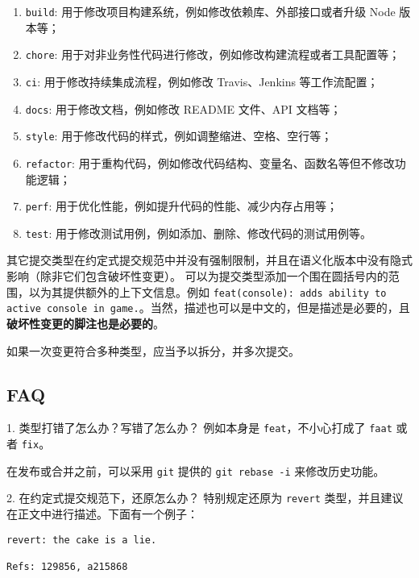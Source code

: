 \begin{enumerate}
\item \verb`build`: 用于修改项目构建系统，例如修改依赖库、外部接口或者升级 Node 版本等；
\item \verb`chore`: 用于对非业务性代码进行修改，例如修改构建流程或者工具配置等；
\item \verb`ci`: 用于修改持续集成流程，例如修改 Travis、Jenkins 等工作流配置；
\item \verb`docs`: 用于修改文档，例如修改 README 文件、API 文档等；
\item \verb`style`: 用于修改代码的样式，例如调整缩进、空格、空行等；
\item \verb`refactor`: 用于重构代码，例如修改代码结构、变量名、函数名等但不修改功能逻辑；
\item \verb`perf`: 用于优化性能，例如提升代码的性能、减少内存占用等；
\item \verb`test`: 用于修改测试用例，例如添加、删除、修改代码的测试用例等。
\end{enumerate}
其它提交类型在约定式提交规范中并没有强制限制，并且在语义化版本中没有隐式影响（除非它们包含破坏性变更）。 可以为提交类型添加一个围在圆括号内的范围，以为其提供额外的上下文信息。例如 \verb`feat(console): adds ability to active console in game.`。当然，描述也可以是中文的，但是描述是必要的，且\textbf{破坏性变更的脚注也是必要的}。

如果一次变更符合多种类型，应当予以拆分，并多次提交。

\subsection{FAQ}
1. 类型打错了怎么办？写错了怎么办？
例如本身是 \verb`feat`，不小心打成了 \verb`faat` 或者 \verb`fix`。

在发布或合并之前，可以采用 \verb`git` 提供的 \verb`git rebase -i` 来修改历史功能。

2. 在约定式提交规范下，还原怎么办？
特别规定还原为 \verb`revert` 类型，并且建议在正文中进行描述。下面有一个例子：
\begin{lstlisting}[language=none]
revert: the cake is a lie.

Refs: 129856, a215868
\end{lstlisting}
